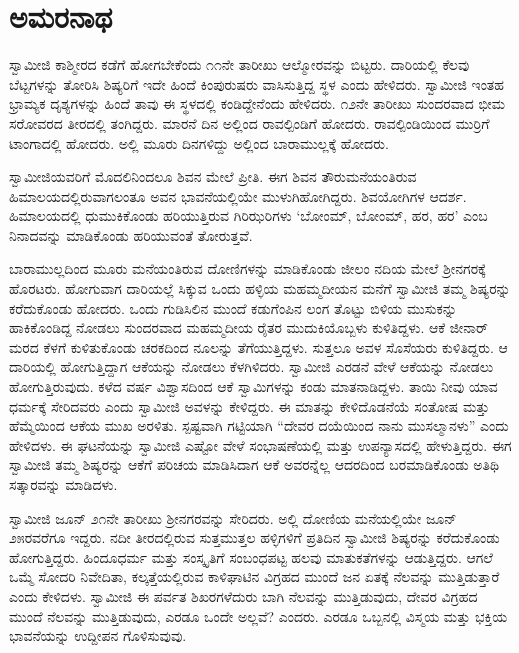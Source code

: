 
\chapter{ಅಮರನಾಥ }

 ಸ್ವಾಮೀಜಿ ಕಾಶ್ಮೀರದ ಕಡೆಗೆ ಹೋಗಬೇಕೆಂದು ೧೧ನೇ ತಾರೀಖು ಆಲ್ಮೋರವನ್ನು ಬಿಟ್ಟರು. ದಾರಿಯಲ್ಲಿ ಕೆಲವು ಬೆಟ್ಟಗಳನ್ನು ತೋರಿಸಿ ಶಿಷ್ಯರಿಗೆ ಇದೇ ಹಿಂದೆ ಕಿಂಪುರುಷರು ವಾಸಿಸುತ್ತಿದ್ದ ಸ್ಥಳ ಎಂದು ಹೇಳಿದರು. ಸ್ವಾಮೀಜಿ ಇಂತಹ ಭ್ರಾಮ್ಯಕ ದೃಶ್ಯಗಳನ್ನು ಹಿಂದೆ ತಾವು ಈ ಸ್ಥಳದಲ್ಲಿ ಕಂಡಿದ್ದೇನೆಂದು ಹೇಳಿದರು. ೧೨ನೇ ತಾರೀಖು ಸುಂದರವಾದ ಭೀಮ ಸರೋವರದ ತೀರದಲ್ಲಿ ತಂಗಿದ್ದರು. ಮಾರನೆ ದಿನ ಅಲ್ಲಿಂದ ರಾವಲ್ಪಿಂಡಿಗೆ ಹೋದರು. ರಾವಲ್ಪಿಂಡಿಯಿಂದ ಮುರ‍್ರಿಗೆ ಟಾಂಗಾದಲ್ಲಿ ಹೋದರು. ಅಲ್ಲಿ ಮೂರು ದಿನಗಳಿದ್ದು ಅಲ್ಲಿಂದ ಬಾರಾಮುಲ್ಲಕ್ಕೆ ಹೋದರು. 

 ಸ್ವಾಮೀಜಿಯವರಿಗೆ ಮೊದಲಿನಿಂದಲೂ ಶಿವನ ಮೇಲೆ ಪ್ರೀತಿ. ಈಗ ಶಿವನ ತೌರುಮನೆಯಂತಿರುವ ಹಿಮಾಲಯದಲ್ಲಿರುವಾಗಲಂತೂ ಅವನ ಭಾವನೆಯಲ್ಲಿಯೇ ಮುಳುಗಿಹೋಗಿದ್ದರು. ಶಿವಯೋಗಿಗಳ ಆದರ್ಶ. ಹಿಮಾಲಯದಲ್ಲಿ ಧುಮುಕಿಕೊಂಡು ಹರಿಯುತ್ತಿರುವ ಗಿರಿಝರಿಗಳು ‘ಬೋಂಮ್, ಬೋಂಮ್, ಹರ, ಹರ’ ಎಂಬ ನಿನಾದವನ್ನು ಮಾಡಿಕೊಂಡು ಹರಿಯುವಂತೆ ತೋರುತ್ತವೆ. 

 ಬಾರಾಮುಲ್ಲದಿಂದ ಮೂರು ಮನೆಯಂತಿರುವ ದೋಣಿಗಳನ್ನು ಮಾಡಿಕೊಂಡು ಜೀಲಂ ನದಿಯ ಮೇಲೆ ಶ‍್ರೀನಗರಕ್ಕೆ ಹೊರಟರು. ಹೋಗುವಾಗ ದಾರಿಯಲ್ಲೆ ಸಿಕ್ಕುವ ಒಂದು ಹಳ್ಳಿಯ ಮಹಮ್ಮದೀಯನ ಮನೆಗೆ ಸ್ವಾಮೀಜಿ ತಮ್ಮ ಶಿಷ್ಯರನ್ನು ಕರೆದುಕೊಂಡು ಹೋದರು. ಒಂದು ಗುಡಿಸಿಲಿನ ಮುಂದೆ ಕಡುಗೆಂಪಿನ ಲಂಗ ತೊಟ್ಟು ಬಿಳಿಯ ಮುಸುಕನ್ನು ಹಾಕಿಕೊಂಡಿದ್ದ ನೋಡಲು ಸುಂದರವಾದ ಮಹಮ್ಮದೀಯ ರೈತರ ಮುದುಕಿಯೊಬ್ಬಳು ಕುಳಿತಿದ್ದಳು. ಆಕೆ ಜೀನಾರ್ ಮರದ ಕೆಳಗೆ ಕುಳಿತುಕೊಂಡು ಚರಕದಿಂದ ನೂಲನ್ನು ತೆಗೆಯುತ್ತಿದ್ದಳು. ಸುತ್ತಲೂ ಅವಳ ಸೊಸೆಯರು ಕುಳಿತಿದ್ದರು. ಆ ದಾರಿಯಲ್ಲಿ ಹೋಗುತ್ತಿದ್ದಾಗ ಆಕೆಯನ್ನು ನೋಡಲು ಕೆಳಗಿಳಿದರು. ಸ್ವಾಮೀಜಿ ಎರಡನೆ ವೇಳೆ ಆಕೆಯನ್ನು ನೋಡಲು ಹೋಗುತ್ತಿರುವುದು. ಕಳೆದ ವರ್ಷ ವಿಶ್ವಾಸದಿಂದ ಆಕೆ ಸ್ವಾಮಿಗಳನ್ನು ಕಂಡು ಮಾತನಾಡಿದ್ದಳು. ತಾಯಿ ನೀವು ಯಾವ ಧರ್ಮಕ್ಕೆ ಸೇರಿದವರು ಎಂದು ಸ್ವಾಮೀಜಿ ಅವಳನ್ನು ಕೇಳಿದ್ದರು. ಈ ಮಾತನ್ನು ಕೇಳಿದೊಡನೆಯೆ ಸಂತೋಷ ಮತ್ತು ಹೆಮ್ಮೆಯಿಂದ ಆಕೆಯ ಮುಖ ಅರಳಿತು. ಸ್ಪಷ್ಟವಾಗಿ ಗಟ್ಟಿಯಾಗಿ “ದೇವರ ದಯೆಯಿಂದ ನಾನು ಮುಸಲ್ಮಾನಳು” ಎಂದು ಹೇಳಿದಳು. ಈ ಘಟನೆಯನ್ನು ಸ್ವಾಮೀಜಿ ಎಷ್ಟೋ‌ ವೇಳೆ ಸಂಭಾಷಣೆಯಲ್ಲಿ ಮತ್ತು ಉಪನ್ಯಾಸದಲ್ಲಿ ಹೇಳುತ್ತಿದ್ದರು. ಈಗ ಸ್ವಾಮೀಜಿ ತಮ್ಮ ಶಿಷ್ಯರನ್ನು ಆಕೆಗೆ ಪರಿಚಯ ಮಾಡಿಸಿದಾಗ ಆಕೆ ಅವರನ್ನೆಲ್ಲ ಆದರದಿಂದ ಬರಮಾಡಿಕೊಂಡು ಅತಿಥಿ ಸತ್ಕಾರವನ್ನು ಮಾಡಿದಳು. 

 ಸ್ವಾಮೀಜಿ ಜೂನ್ ೨೧ನೇ ತಾರೀಖು ಶ‍್ರೀನಗರವನ್ನು ಸೇರಿದರು. ಅಲ್ಲಿ ದೋಣಿಯ ಮನೆಯಲ್ಲಿಯೇ ಜೂನ್ ೨೫ರವರೆಗೂ ಇದ್ದರು. ನದೀ ತೀರದಲ್ಲಿರುವ ಸುತ್ತಮುತ್ತಲ ಹಳ್ಳಿಗಳಿಗೆ ಪ್ರತಿದಿನ ಸ್ವಾಮೀಜಿ ಶಿಷ್ಯರನ್ನು ಕರೆದುಕೊಂಡು ಹೋಗುತ್ತಿದ್ದರು. ಹಿಂದೂಧರ್ಮ ಮತ್ತು ಸಂಸ್ಕೃತಿಗೆ ಸಂಬಂಧಪಟ್ಟ ಹಲವು ಮಾತುಕತೆಗಳನ್ನು ಆಡುತ್ತಿದ್ದರು. ಆಗಲೆ ಒಮ್ಮೆ ಸೋದರಿ ನಿವೇದಿತಾ, ಕಲ್ಕತ್ತೆಯಲ್ಲಿರುವ ಕಾಳಿಘಾಟಿನ ವಿಗ್ರಹದ ಮುಂದೆ ಜನ ಏತಕ್ಕೆ ನೆಲವನ್ನು ಮುತ್ತಿಡುತ್ತಾರೆ ಎಂದು ಕೇಳಿದಳು. ಸ್ವಾಮೀಜಿ ಈ ಪರ್ವತ ಶಿಖರಗಳೆದುರು ಬಾಗಿ ನೆಲವನ್ನು ಮುತ್ತಿಡುವುದು, ದೇವರ ವಿಗ್ರಹದ ಮುಂದೆ ನೆಲವನ್ನು ಮುತ್ತಿಡುವುದು, ಎರಡೂ ಒಂದೇ ಅಲ್ಲವೆ? ಎಂದರು. ಎರಡೂ ಒಬ್ಬನಲ್ಲಿ ವಿಸ್ಮಯ ಮತ್ತು ಭಕ್ತಿಯ ಭಾವನೆಯನ್ನು ಉದ್ದೀಪನ ಗೊಳಿಸುವುವು. 

